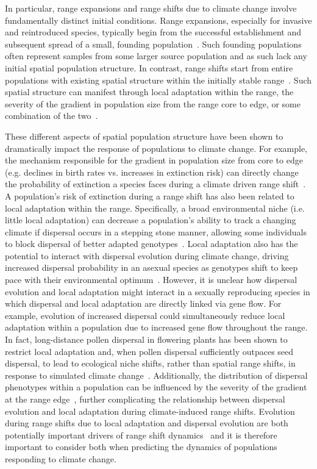 \documentclass[11pt, oneside]{article}
\begin{document}
In particular, range expansions and range shifts due to climate change involve fundamentally distinct initial conditions. Range expansions, especially for invasive and reintroduced species, typically begin from the successful establishment and subsequent spread of a small, founding population~\citep{hastings2005spatial}. Such founding populations often represent samples from some larger source population and as such lack any initial spatial population structure. In contrast, range shifts start from entire populations with existing spatial structure within the initially stable range~\citep{hargreaves2014evolution}. Such spatial structure can manifest through local adaptation within the range, the severity of the gradient in population size from the range core to edge, or some combination of the two~\citep{hargreaves2014evolution, hargreaves2015fitness, henry2013eco}. 

These different aspects of spatial population structure have been shown to dramatically impact the response of populations to climate change. For example, the mechanism responsible for the gradient in population size from core to edge (e.g. declines in birth rates vs. increases in extinction risk) can directly change the probability of extinction a species faces during a climate driven range shift~\citep{henry2013eco}. A population's risk of extinction during a range shift has also been related to local adaptation within the range. Specifically, a broad environmental niche (i.e. little local adaptation) can decrease a population's ability to track a changing climate if dispersal occurs in a stepping stone manner, allowing some individuals to block dispersal of better adapted genotypes~\citep{atkins2010local}. Local adaptation also has the potential to interact with dispersal evolution during climate change, driving increased dispersal probability in an asexual species as genotypes shift to keep pace with their environmental optimum~\citep{hargreaves2015fitness}. However, it is unclear how dispersal evolution and local adaptation might interact in a sexually reproducing species in which dispersal and local adaptation are directly linked via gene flow. For example, evolution of increased dispersal could simultaneously reduce local adaptation within a population due to increased gene flow throughout the range. In fact, long-distance pollen dispersal in flowering plants has been shown to restrict local adaptation and, when pollen dispersal sufficiently outpaces seed dispersal, to lead to ecological niche shifts, rather than spatial range shifts, in response to simulated climate change~\citep{aguilee2016pollen}. Additionally, the distribution of dispersal phenotypes within a population can be influenced by the severity of the gradient at the range edge~\citep{henry2013eco, hargreaves2014evolution}, further complicating the relationship between dispersal evolution and local adaptation during climate-induced range shifts. Evolution during range shifts due to local adaptation and dispersal evolution are both potentially important drivers of range shift dynamics~\citep{van2016spatial} and it is therefore important to consider both when predicting the dynamics of populations responding to climate change.
\end{document}
